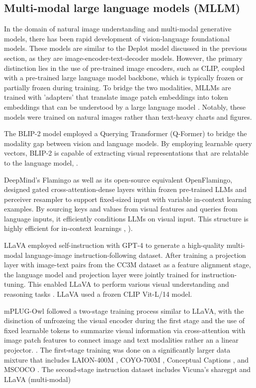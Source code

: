 \documentclass{article}
\begin{document}
\subsection{Multi-modal large language models (MLLM)}

In the domain of natural image understanding and multi-modal generative models, there has been rapid development of vision-language foundational models. These models are similar to the Deplot model discussed in the previous section, as they are image-encoder-text-decoder models. However, the primary distinction lies in the use of pre-trained image encoders, such as CLIP, coupled with a pre-trained large language model backbone, which is typically frozen or partially frozen during training. To bridge the two modalities, MLLMs are trained with 'adapters' that translate image patch embeddings into token embeddings that can be understood by a large language model \cite{yin2023survey}. Notably, these models were trained on natural images rather than text-heavy charts and figures.

The BLIP-2 model employed a Querying Transformer (Q-Former) to bridge the modality gap between vision and language models. By employing learnable query vectors, BLIP-2 is capable of extracting visual representations that are relatable to the language model, \cite{li2023}.

 DeepMind's Flamingo as well as its open-source equivalent OpenFlamingo, designed gated cross-attention-dense layers within frozen pre-trained LLMs and perceiver resampler to support fixed-sized input with variable in-context learning examples. By sourcing keys and values from visual features and queries from language inputs, it efficiently conditions LLMs on visual input. This structure is highly efficient for in-context learnings \cite{alayrac2022flamingo}, \cite{anas2023}).

 LLaVA employed self-instruction with GPT-4 to generate a high-quality multi-modal language-image instruction-following dataset. After training a projection layer with image-text pairs from the CC3M dataset as a feature alignment stage, the language model and projection layer were jointly trained for instruction-tuning. This enabled LLaVA to perform various visual understanding and reasoning tasks  \cite{liu2023}. LLaVA used a frozen CLIP Vit-L/14 model. 

mPLUG-Owl followed a two-stage training process similar to LLaVA, with the disinction of unfrozeing the visual encoder during the first stage and the use of fixed learnable tokens to summarize visual information via cross-attention with image patch features to connect image and text modalities rather an a linear projector. \cite{ye2023}. The first-stage training was done on a significantly larger data mixture that includes LAION-400M \cite{schuhmann2021laion}, COYO-700M \cite{kakaobrain2022coyo-700m}, Conceptual Captions \cite{sharma2018conceptual}, and MSCOCO \cite{lin2014microsoft}. The second-stage instruction dataset includes Vicuna's sharegpt \cite{vicuna2023} and LLaVA (multi-modal) \cite{liu2023}
\end{document}
